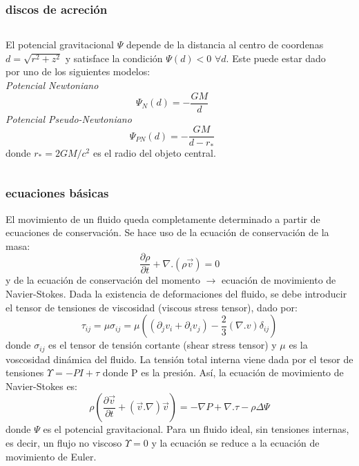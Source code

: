 \documentclass{beamer}
\begin{document}
\begin{frame}
\frametitle{discos de acreción}
\begin{columns}
\begin{column}{1\textwidth}
 \justify
El potencial gravitacional $\Psi$ depende de la distancia al centro
de coordenas $d=\sqrt{r^{2}+z^{2}}$ y satisface la condición 
$\Psi (d) < 0 $ $\forall d $. 
Este puede estar dado por uno de los siguientes modelos:\\
\vspace{0.3cm}
{\it{Potencial Newtoniano}}
\begin{equation*}
\Psi_{N} (d)=-\frac{GM}{d} 
\end{equation*}
{\it{Potencial Pseudo-Newtoniano}}
\begin{equation*}
 \Psi_{PN}(d) = -\frac{GM}{d-r_{*}}
\end{equation*}
donde $r_{*}=2GM/c^{2}$ es el radio del objeto central.
\end{column}
\begin{column}{0.0\textwidth}
\end{column}
\end{columns}
\end{frame}




\renewcommand{\thempfootnote}{\arabic{mpfootnote}}
\begin{frame}
\frametitle{ecuaciones básicas}
\justify
\scriptsize
\vspace*{-0.7cm}
El movimiento de un fluido queda completamente determinado a partir de ecuaciones de conservación.
Se hace uso de la ecuación de conservación de la masa:
\begin{equation}\label{eq:consmasa}
 \frac{\partial \rho}{\partial t} + \nabla . (\rho \vec{v}) = 0
\end{equation}
y de la ecuación de conservación del momento $\rightarrow$ ecuación de movimiento de Navier-Stokes.
Dada la existencia de deformaciones del fluido, se debe introducir el tensor de tensiones de viscosidad
(viscous stress tensor), dado por:
\begin{equation*}
 \tau_{ij} = \mu \sigma _{ij} = \mu \left( (\partial_{j}v_{i} + \partial_{i}v_{j}) - \frac{2}{3}(\nabla .v)\delta_{ij} \right)
\end{equation*}
donde $\sigma_{ij}$ es el tensor de tensión cortante (shear stress tensor) y $\mu$ es la voscosidad dinámica del fluido.
La tensión total interna viene dada por el tesor de tensiones $\Upsilon=-PI+\tau$ donde P es la presión. Así,
la ecuación de movimiento de Navier-Stokes es:
\begin{equation}\label{eq:consmomento}
 \rho \left( \frac{\partial \vec{v}}{\partial t} + (\vec{v}.\nabla)\vec{v} \right) = -\nabla P + \nabla . \tau -  \rho \Delta \Psi
\end{equation}
donde $\Psi$ es el potencial gravitacional.
Para un fluido ideal, sin tensiones internas, es decir, un flujo no viscoso $\Upsilon=0$ y la ecuación
se reduce a la ecuación de movimiento de Euler.
\end{frame}
\end{document}
